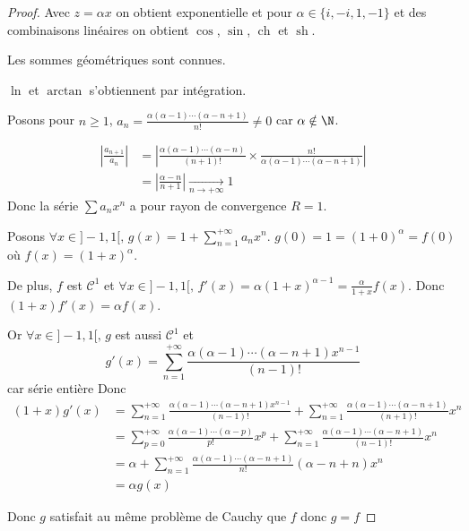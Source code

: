 \begin{proof}
    Avec $z = \alpha x$ on obtient exponentielle et pour $\alpha \in \{i, -i, 1, -1\}$ et des combinaisons linéaires on obtient 
    $\cos$, $\sin$, $\operatorname{ch}$ et $\operatorname{sh}$.

    Les sommes géométriques sont connues. 

    $\ln$ et $\arctan$ s'obtiennent par intégration. 

    Posons pour $n \geqslant 1$, $a_n = \frac{\alpha (\alpha - 1) \cdots (\alpha - n + 1)}{n!} \neq 0$ 
    car $\alpha \notin \N$.  

    \begin{align}
        \left| \frac{a_{n + 1}}{a_n} \right| & = \left| \frac{\alpha (\alpha - 1) \cdots (\alpha - n)}{(n + 1)!} \times \frac{n!}{\alpha (\alpha - 1) \cdots (\alpha - n + 1)} \right| \\
        & = \left| \frac{\alpha - n }{n + 1} \right| \xrightarrow[n \to + \infty]{} 1
    \end{align}
    Donc la série $\sum a_n x^n$ a pour rayon de convergence $R = 1$.

    Posons $\displaystyle \forall x \in ]-1, 1[, \, g(x) = 1 + \sum_{n = 1}^{+\infty} a_n x^n$. 
    $g(0) = 1 = (1 + 0)^\alpha = f(0)$ où $f(x) = (1 + x)^\alpha$. 

    De plus, $f$ est $\mathscr C^1$ et $\forall x \in ]-1, 1[, \, f'(x) = \alpha (1 + x)^{\alpha - 1} = \frac \alpha {1 + x} f(x)$.
    Donc $(1 + x) f'(x) = \alpha f(x)$. 

    Or $\forall x \in ]-1, 1[, \, g$ est aussi $\mathscr C^1$ et
    $$ g'(x) = \sum_{n = 1 }^{+ \infty  } \frac{\alpha (\alpha - 1) \cdots (\alpha - n + 1) x^{n - 1}}{(n - 1 )! }$$ car série entière 
    Donc 
    \begin{align}
        (1 + x) g'(x) & = \displaystyle \sum_{n = 1 }^{+ \infty   } \frac{\alpha (\alpha - 1) \cdots (\alpha - n + 1) x^{n - 1}}{(n - 1)!} + \sum_{n = 1 }^{+ \infty   } \frac{\alpha (\alpha - 1) \cdots (\alpha - n + 1) }{(n + 1)!} x^n \\
        & = \sum_{p = 0 }^{+ \infty    } \frac{\alpha (\alpha - 1) \cdots (\alpha - p)}{p!} x^p + \sum_{n = 1 }^{+ \infty   } \frac{\alpha (\alpha - 1) \cdots (\alpha - n + 1)}{(n - 1)!} x^n \\
        & = \alpha + \sum_{n = 1 }^{+ \infty   } \frac{\alpha (\alpha - 1) \cdots (\alpha - n + 1)}{n! } (\alpha - n + n) x^n \\
        & = \alpha g(x)
    \end{align}

    Donc $g$ satisfait au même problème de Cauchy que $f$ donc $g = f$ 
\end{proof}
